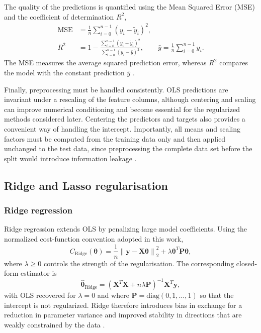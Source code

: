 \documentclass[aps,rmp,reprint,amsmath,amssymb,graphicx,longbibliography]{revtex4-1}
\begin{document}
The quality of the predictions is quantified using the Mean Squared Error
(MSE) and the coefficient of determination $R^2$,
\begin{align}
    \mathrm{MSE}
    &= \frac{1}{n}\sum_{i=0}^{n-1}
       \left(y_i-\tilde{y}_i\right)^2, 
       \label{eq:MSE}\\
    R^2
    &= 1-
    \frac{\sum_{i=0}^{n-1}(y_i-\tilde{y}_i)^2}
         {\sum_{i=0}^{n-1}(y_i-\bar{y})^2},
    \qquad
    \bar{y}=\frac{1}{n}\sum_{i=0}^{n-1}y_i .
    \label{eq:R2}
\end{align}
The MSE measures the average squared prediction error, whereas $R^2$ compares
the model with the constant prediction $\bar{y}$ \cite{HjorthJensen2026MLPS}.

Finally, preprocessing must be handled consistently. OLS predictions are
invariant under a rescaling of the feature columns, although centering and
scaling can improve numerical conditioning and become essential for the
regularized methods considered later. Centering the predictors and targets also
provides a convenient way of handling the intercept. Importantly, all means
and scaling factors must be computed from the training data only and then
applied unchanged to the test data, since preprocessing the complete data set
before the split would introduce information leakage
\cite{HjorthJensen2026MLPS,UiOProject1_2026}.


\subsection{Ridge and Lasso regularisation}
\label{subsec: ridge regularisation}

\subsubsection*{Ridge regression}

Ridge regression extends OLS by penalizing large model
coefficients. Using the normalized cost-function convention adopted in this
work,
\begin{equation}
    C_{\mathrm{Ridge}}(\boldsymbol{\theta})
    =
    \frac{1}{n}
    \left\lVert
    \mathbf{y}-\mathbf{X}\boldsymbol{\theta}
    \right\rVert_2^2
    +
    \lambda
    \boldsymbol{\theta}^{T}\mathbf{P}\boldsymbol{\theta},
    \label{eq:cost_function}
\end{equation}
where $\lambda\geq0$ controls the strength of the regularisation. The
corresponding closed-form estimator is
\begin{equation}
    \hat{\boldsymbol{\theta}}_{\mathrm{Ridge}}
    =
    \left(
    \mathbf{X}^{T}\mathbf{X}
    +n\lambda\mathbf{P}
    \right)^{-1}
    \mathbf{X}^{T}\mathbf{y},
    \label{eq:Ridge_parameter}
\end{equation}
with OLS recovered for $\lambda=0$ and where $\mathbf{P}=\mathrm{diag}(0,1,\ldots,1)$ so that the intercept is not regularized. Ridge therefore introduces bias in exchange
for a reduction in parameter variance and improved stability in directions
that are weakly constrained by the data \cite{HjorthJensen2026MLPS}.
\end{document}
